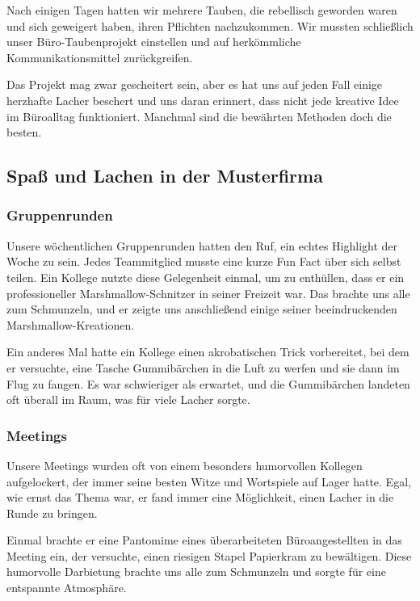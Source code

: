 Nach einigen Tagen hatten wir mehrere Tauben, die rebellisch geworden waren und sich geweigert haben, ihren Pflichten nachzukommen. Wir mussten schließlich unser Büro-Taubenprojekt einstellen und auf herkömmliche Kommunikationsmittel zurück\-greifen.

Das Projekt mag zwar gescheitert sein, aber es hat uns auf jeden Fall einige herzhafte Lacher beschert und uns daran erinnert, dass nicht jede kreative Idee im Büroalltag funktioniert. Manchmal sind die bewährten Methoden doch die besten.

\subsection{Spaß und Lachen in der Musterfirma}

\subsubsection{Gruppenrunden}

Unsere wöchentlichen Gruppenrunden hatten den Ruf, ein echtes Highlight der Woche zu sein. Jedes Teammitglied musste eine kurze Fun Fact über sich selbst teilen. Ein Kollege nutzte diese Gelegenheit einmal, um zu enthüllen, dass er ein professioneller Marshmallow-Schnitzer in seiner Freizeit war. Das brachte uns alle zum Schmunzeln, und er zeigte uns anschließend einige seiner beeindruckenden Marshmallow-Kreationen.

Ein anderes Mal hatte ein Kollege einen akrobatischen Trick vorbereitet, bei dem er versuchte, eine Tasche Gummibärchen in die Luft zu werfen und sie dann im Flug zu fangen. Es war schwieriger als erwartet, und die Gummibärchen landeten oft überall im Raum, was für viele Lacher sorgte.

\subsubsection{Meetings}

Unsere Meetings wurden oft von einem besonders humorvollen Kollegen aufgelockert, der immer seine besten Witze und Wortspiele auf Lager hatte. Egal, wie ernst das Thema war, er fand immer eine Möglichkeit, einen Lacher in die Runde zu bringen.

Einmal brachte er eine Pantomime eines überarbeiteten Büroangestellten in das Meeting ein, der versuchte, einen riesigen Stapel Papierkram zu bewältigen. Diese humorvolle Darbietung brachte uns alle zum Schmunzeln und sorgte für eine entspannte Atmosphäre.

